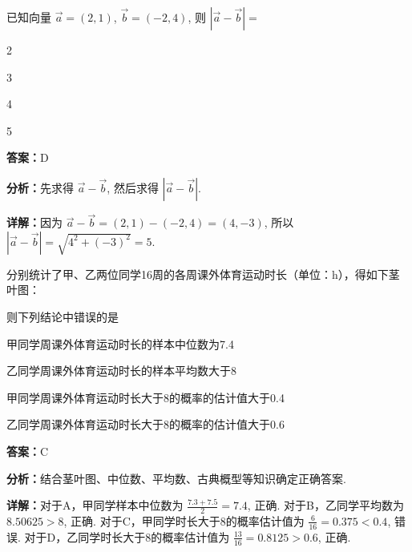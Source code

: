 \begin{question}[points=5]
已知向量 $\vec{a}=(2,1)$, $\vec{b}=(-2,4)$, 则 $|\vec{a} - \vec{b}| =$
\begin{choices}
  \item 2
  \item 3
  \item 4
  \item 5
\end{choices}
\begin{solution}
\textbf{答案：}D

\textbf{分析：}先求得 $\vec{a} - \vec{b}$, 然后求得 $|\vec{a} - \vec{b}|$.

\textbf{详解：}因为 $\vec{a} - \vec{b} = (2,1) - (-2,4) = (4,-3)$, 所以 $|\vec{a} - \vec{b}| = \sqrt{4^2 + (-3)^2} = 5$.
\end{solution}
\end{question}

\begin{question}[points=5]
分别统计了甲、乙两位同学16周的各周课外体育运动时长（单位：h），得如下茎叶图：



则下列结论中错误的是
\begin{choices}
  \item 甲同学周课外体育运动时长的样本中位数为7.4
  \item 乙同学周课外体育运动时长的样本平均数大于8
  \item 甲同学周课外体育运动时长大于8的概率的估计值大于0.4
  \item 乙同学周课外体育运动时长大于8的概率的估计值大于0.6
\end{choices}
\begin{solution}
\textbf{答案：}C

\textbf{分析：}结合茎叶图、中位数、平均数、古典概型等知识确定正确答案.

\textbf{详解：}对于A，甲同学样本中位数为 $\frac{7.3+7.5}{2}=7.4$, 正确. 对于B，乙同学平均数为 $8.50625>8$, 正确. 对于C，甲同学时长大于8的概率估计值为 $\frac{6}{16}=0.375<0.4$, 错误. 对于D，乙同学时长大于8的概率估计值为 $\frac{13}{16}=0.8125>0.6$, 正确.
\end{solution}
\end{question}

